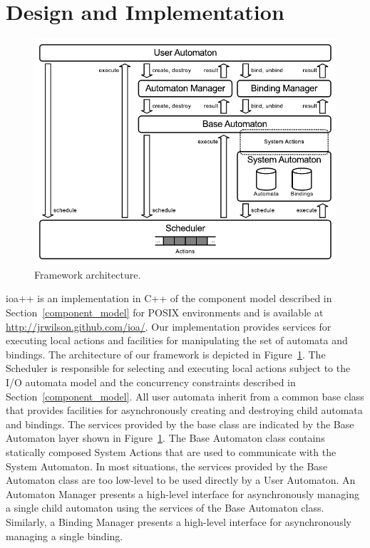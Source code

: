 \section{Design and Implementation\label{design}}

\begin{figure}
\center
\includegraphics[width=\columnwidth]{architecture}
\caption{Framework architecture.}
\label{framework_architecture}
\end{figure}

ioa++ is an implementation in C++ of the component model described in Section~\ref{component_model} for POSIX environments and is available at \url{http://jrwilson.github.com/ioa/}.
Our implementation provides services for executing local actions and facilities for manipulating the set of automata and bindings.
The architecture of our framework is depicted in Figure~\ref{framework_architecture}.
The Scheduler is responsible for selecting and executing local actions subject to the I/O automata model and the concurrency constraints described in Section~\ref{component_model}.
All user automata inherit from a common base class that provides facilities for asynchronously creating and destroying child automata and bindings.
The services provided by the base class are indicated by the Base Automaton layer shown in Figure~\ref{framework_architecture}.
The Base Automaton class contains statically composed System Actions that are used to communicate with the System Automaton.
In most situations, the services provided by the Base Automaton class are too low-level to be used directly by a User Automaton.
An Automaton Manager presents a high-level interface for asynchronously managing a single child automaton using the services of the Base Automaton class.
Similarly, a Binding Manager presents a high-level interface for asynchronously managing a single binding.

